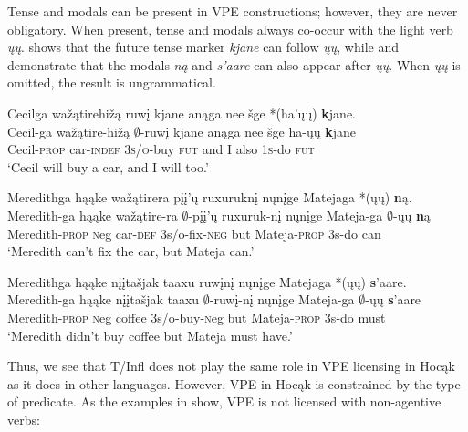 \documentclass[output=paper]{LSP/langsci}
\begin{document}
Tense and modals can be present in VPE constructions; however, they are never obligatory. When present, tense and modals always co-occur with the light verb \emph{ųų}.  shows that the future tense marker \emph{kjane} can follow \emph{ųų}, while  and  demonstrate that the modals \emph{ną} and \emph{s'aare} can also appear after \emph{ųų}. When \emph{ųų} is omitted, the result is ungrammatical.
 
\ea\label{ex:johnson:19}
\ea\label{ex:johnson:19a} 
\glll Cecilga wažątirehižą ruwį kjane anąga nee šge *(ha'ųų) {\textbf kjane}.\\
Cecil-ga wažątire-hižą $\emptyset$-ruwį kjane anąga nee šge ha-ųų {\textbf kjane}\\
Cecil-\textsc{prop} car-\textsc{indef} \textsc{3s/o}-buy \textsc{fut} and I also \textsc{1s}-do \textsc{fut}\\
\trans `Cecil will buy a car, and I will too.' 
 
\ex\label{ex:johnson:19b} 
\glll Meredithga hąąke wažątirera {pįį'ų ruxuruknį} nųnįge Matejaga *(ųų) {\textbf ną}.\\
Meredith-ga hąąke wažątire-ra {$\emptyset$-pįį'ų ruxuruk-nį} nųnįge Mateja-ga $\emptyset$-ųų {\textbf ną}\\
Meredith-\textsc{prop} {\textsc neg} car-\textsc{def} {\textsc 3s/o}-fix-\textsc{neg} but Mateja-\textsc{prop} {\textsc 3s}-do can\\
\trans `Meredith can't fix the car, but Mateja can.'
 
\ex\label{ex:johnson:19c} 
\glll Meredithga hąąke {nįįtašjak taaxu} ruwįnį nųnįge Matejaga *(ųų) {\textbf s'aare}.\\ 
Meredith-ga hąąke {nįįtašjak taaxu} $\emptyset$-ruwį-nį nųnįge Mateja-ga $\emptyset$-ųų {\textbf s'aare}\\
Meredith-\textsc{prop} {\textsc neg} coffee {\textsc 3s/o}-buy-{\textsc neg} but Mateja-\textsc{prop} {\textsc 3s}-do must\\
\trans `Meredith didn't buy coffee but Mateja must have.' 
\z
\z

Thus, we see that T/Infl does not play the same role in VPE licensing in Hocąk as it does in other languages. However, VPE in Hocąk is constrained by the type of predicate. As the examples in  show, VPE is not licensed with non-agentive verbs:
\end{document}
